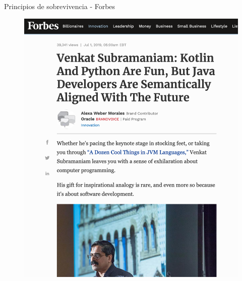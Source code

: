 \documentclass[aspectratio=169]{beamer}
\begin{document}
\begin{frame}{Principios de sobrevivencia - Forbes}
    \begin{figure}
        \centering
        \includegraphics[width=0.5\linewidth]{Images/venkat}
    \end{figure}
\end{frame}



{
    \begin{frame}
    \end{frame}
}
\end{document}
